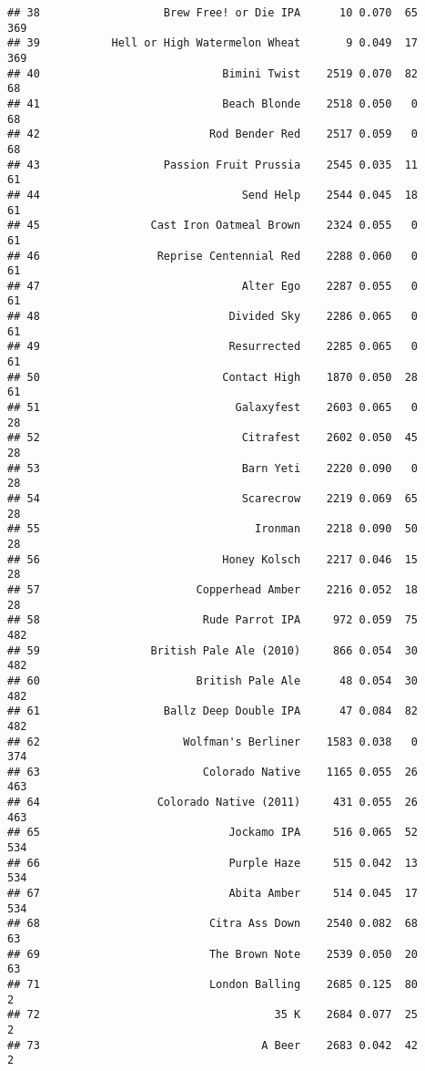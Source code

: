 \documentclass[
]{article}
\begin{document}
\begin{verbatim}
## 38                   Brew Free! or Die IPA      10 0.070  65        369
## 39           Hell or High Watermelon Wheat       9 0.049  17        369
## 40                            Bimini Twist    2519 0.070  82         68
## 41                            Beach Blonde    2518 0.050   0         68
## 42                          Rod Bender Red    2517 0.059   0         68
## 43                   Passion Fruit Prussia    2545 0.035  11         61
## 44                               Send Help    2544 0.045  18         61
## 45                 Cast Iron Oatmeal Brown    2324 0.055   0         61
## 46                  Reprise Centennial Red    2288 0.060   0         61
## 47                               Alter Ego    2287 0.055   0         61
## 48                             Divided Sky    2286 0.065   0         61
## 49                             Resurrected    2285 0.065   0         61
## 50                            Contact High    1870 0.050  28         61
## 51                              Galaxyfest    2603 0.065   0         28
## 52                               Citrafest    2602 0.050  45         28
## 53                               Barn Yeti    2220 0.090   0         28
## 54                               Scarecrow    2219 0.069  65         28
## 55                                 Ironman    2218 0.090  50         28
## 56                            Honey Kolsch    2217 0.046  15         28
## 57                        Copperhead Amber    2216 0.052  18         28
## 58                         Rude Parrot IPA     972 0.059  75        482
## 59                 British Pale Ale (2010)     866 0.054  30        482
## 60                        British Pale Ale      48 0.054  30        482
## 61                   Ballz Deep Double IPA      47 0.084  82        482
## 62                      Wolfman's Berliner    1583 0.038   0        374
## 63                         Colorado Native    1165 0.055  26        463
## 64                  Colorado Native (2011)     431 0.055  26        463
## 65                             Jockamo IPA     516 0.065  52        534
## 66                             Purple Haze     515 0.042  13        534
## 67                             Abita Amber     514 0.045  17        534
## 68                          Citra Ass Down    2540 0.082  68         63
## 69                          The Brown Note    2539 0.050  20         63
## 71                          London Balling    2685 0.125  80          2
## 72                                    35 K    2684 0.077  25          2
## 73                                  A Beer    2683 0.042  42          2

\end{verbatim}
\end{document}
